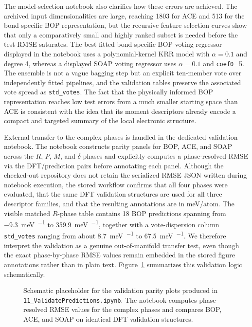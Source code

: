 The model-selection notebook also clarifies how these errors are achieved. The archived input dimensionalities are large, reaching 1803 for ACE and 513 for the bond-specific BOP representation, but the recursive feature-selection curves show that only a comparatively small and highly ranked subset is needed before the test RMSE saturates. The best fitted bond-specific BOP voting regressor displayed in the notebook uses a polynomial-kernel KRR model with $\alpha=0.1$ and degree 4, whereas a displayed SOAP voting regressor uses $\alpha=0.1$ and \texttt{coef0}=5. The ensemble is not a vague bagging step but an explicit ten-member vote over independently fitted pipelines, and the validation tables preserve the associated vote spread as \texttt{std\_votes}. The fact that the physically informed BOP representation reaches low test errors from a much smaller starting space than ACE is consistent with the idea that its moment descriptors already encode a compact and targeted summary of the local electronic structure.

External transfer to the complex phases is handled in the dedicated validation notebook. The notebook constructs parity panels for BOP, ACE, and SOAP across the $R$, $P$, $M$, and $\delta$ phases and explicitly computes a phase-resolved RMSE via the DFT/prediction pairs before annotating each panel. Although the checked-out repository does not retain the serialized RMSE JSON written during notebook execution, the stored workflow confirms that all four phases were evaluated, that the same DFT validation structures are used for all three descriptor families, and that the resulting annotations are in meV/atom. The visible matched $R$-phase table contains 18 BOP predictions spanning from \SI{-9.3}{\milli\electronvolt\per\atom} to \SI{359.9}{\milli\electronvolt\per\atom}, together with a vote-dispersion column \texttt{std\_votes} ranging from about \SI{8.7}{\milli\electronvolt\per\atom} to \SI{67.5}{\milli\electronvolt\per\atom}. We therefore interpret the validation as a genuine out-of-manifold transfer test, even though the exact phase-by-phase RMSE values remain embedded in the stored figure annotations rather than in plain text. Figure~\ref{fig:parity} summarizes this validation logic schematically.

\begin{figure}[t]
\centering
{}
\caption{Schematic placeholder for the validation parity plots produced in \texttt{11\_ValidatePredictions.ipynb}. The notebook computes phase-resolved RMSE values for the complex phases and compares BOP, ACE, and SOAP on identical DFT validation structures.}
\label{fig:parity}
\end{figure}

